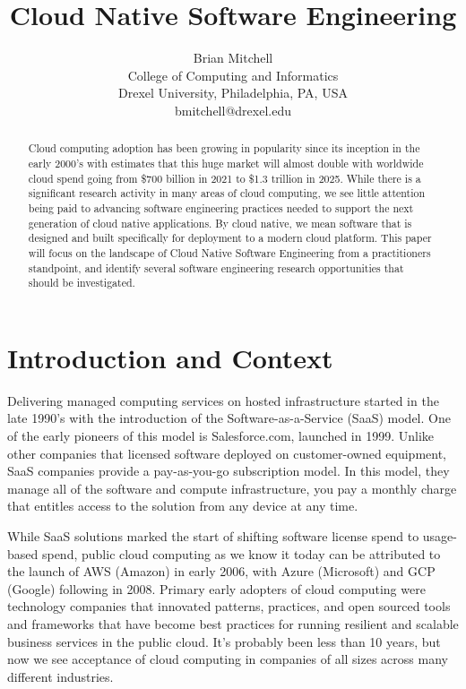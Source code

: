 \documentclass[conference]{IEEEconf}
\title{ 
        	Cloud Native Software Engineering 
      }
\author{
			Brian Mitchell\\
			College of Computing and Informatics\\
			Drexel University, Philadelphia, PA, USA\\
			bmitchell@drexel.edu
}
\date{}
\begin{document}
%

\maketitle

\thispagestyle{empty}


\begin{abstract}

Cloud computing adoption has been growing in popularity since its inception in the early 2000's with estimates that this huge market will almost double with worldwide cloud spend going from \$700 billion in 2021 to \$1.3 trillion in 2025\cite{IDCReport}. While there is a significant research activity in many areas of cloud computing, we see little attention being paid to advancing software engineering practices needed to support the next generation of cloud native applications.  By cloud native, we mean software that is designed and built specifically for deployment to a modern cloud platform. This paper will focus on the landscape of Cloud Native Software Engineering from a practitioners standpoint, and identify several software engineering research opportunities that should be investigated. 

\end{abstract}  



\section{Introduction and Context}
\label{Intro}
Delivering managed computing services on hosted infrastructure started in the late 1990's with the introduction of the Software-as-a-Service (SaaS) model. One of the early pioneers of this model is Salesforce.com, launched in 1999\cite{SalesforceHistory}.  Unlike other companies that licensed software  deployed on customer-owned equipment, SaaS companies provide a pay-as-you-go  subscription model. In this model, they manage all of the software and compute infrastructure, you pay a monthly charge that entitles access to the solution from any device at any time.     

While SaaS solutions marked the start of shifting software license spend to usage-based spend, public cloud computing as we know it today can be attributed to the launch of AWS (Amazon) \cite{AWSLaunch} in early 2006, with Azure (Microsoft)\cite{AzureLaunch} and GCP (Google)\cite{GCPLaunch} following in 2008. Primary early adopters of cloud computing were technology companies that innovated patterns, practices, and open sourced tools and frameworks that have become best practices for running resilient and scalable business services in the public cloud.  It's probably been less than 10 years, but now we see acceptance of cloud computing in companies of all sizes across many different industries. 
\end{document}
